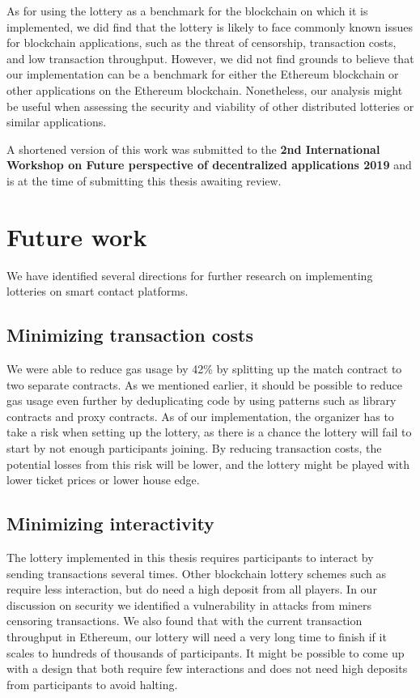 As for using the lottery as a benchmark for the blockchain on which it is implemented, we did find that the lottery is likely to face commonly known issues for blockchain applications, such as the threat of censorship, transaction costs, and low transaction throughput. However, we did not find grounds to believe that our implementation can be a benchmark for either the Ethereum blockchain or other applications on the Ethereum blockchain. Nonetheless, our analysis might be useful when assessing the security and viability of other distributed lotteries or similar applications.

A shortened version of this work was submitted to the \textbf{2nd International Workshop on Future perspective of decentralized applications 2019} and is at the time of submitting this thesis awaiting review.

\section{Future work}
\label{sec:future-work}

We have identified several directions for further research on implementing lotteries on smart contact platforms.

\subsection{Minimizing transaction costs}

We were able to reduce gas usage by 42\% by splitting up the match contract to two separate contracts. As we mentioned earlier, it should be possible to reduce gas usage even further by deduplicating code by using patterns such as library contracts and proxy contracts. As of our implementation, the organizer has to take a risk when setting up the lottery, as there is a chance the lottery will fail to start by not enough participants joining. By reducing transaction costs, the potential losses from this risk will be lower, and the lottery might be played with lower ticket prices or lower house edge.

\subsection{Minimizing interactivity}

The lottery implemented in this thesis requires participants to interact by sending transactions several times. Other blockchain lottery schemes such as~\cite{andrychowicz_secure_2014,bentov_how_2014} require less interaction, but do need a high deposit from all players. In our discussion on security we identified a vulnerability in attacks from miners censoring transactions. We also found that with the current transaction throughput in Ethereum, our lottery will need a very long time to finish if it scales to hundreds of thousands of participants. It might be possible to come up with a design that both require few interactions and does not need high deposits from participants to avoid halting.

